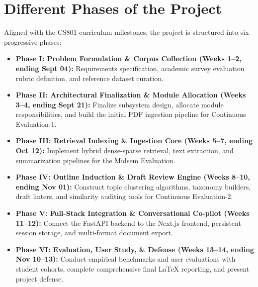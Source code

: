 \documentclass[10pt,a4paper]{article}
\begin{document}
\section{Different Phases of the Project}
Aligned with the CS801 curriculum milestones, the project is structured into six progressive phases:
\begin{itemize}
    \item \textbf{Phase I: Problem Formulation \& Corpus Collection (Weeks 1--2, ending Sept 04):} Requirements specification, academic survey evaluation rubric definition, and reference dataset curation.
    \item \textbf{Phase II: Architectural Finalization \& Module Allocation (Weeks 3--4, ending Sept 21):} Finalize subsystem design, allocate module responsibilities, and build the initial PDF ingestion pipeline for Continuous Evaluation-1.
    \item \textbf{Phase III: Retrieval Indexing \& Ingestion Core (Weeks 5--7, ending Oct 12):} Implement hybrid dense-sparse retrieval, text extraction, and summarization pipelines for the Midsem Evaluation.
    \item \textbf{Phase IV: Outline Induction \& Draft Review Engine (Weeks 8--10, ending Nov 01):} Construct topic clustering algorithms, taxonomy builders, draft linters, and similarity auditing tools for Continuous Evaluation-2.
    \item \textbf{Phase V: Full-Stack Integration \& Conversational Co-pilot (Weeks 11--12):} Connect the FastAPI backend to the Next.js frontend, persistent session storage, and multi-format document export.
    \item \textbf{Phase VI: Evaluation, User Study, \& Defense (Weeks 13--14, ending Nov 10--13):} Conduct empirical benchmarks and user evaluations with student cohorts, complete comprehensive final LaTeX reporting, and present project defense.
\end{itemize}

\end{document}
